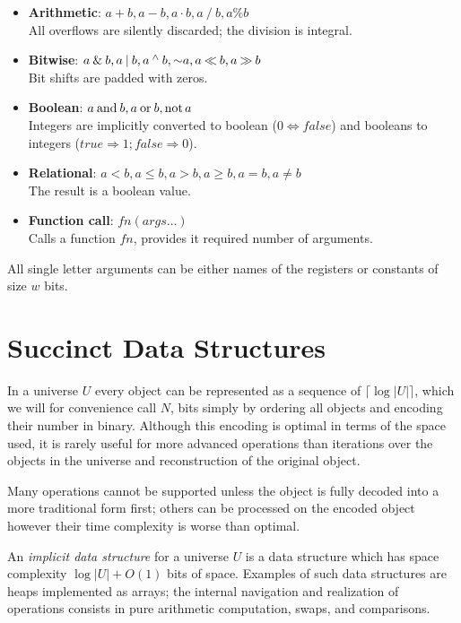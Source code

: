 \begin{enumerate}
\begin{itemize}
		\item \textbf{Arithmetic}: $a + b, a - b, a \cdot b, a \mathbin{/} b, a \% b$ \\
		All overflows are silently discarded; the division is integral.
		\item \textbf{Bitwise}: $a \mathbin{\&} b, a \mathbin{|} b, a \mathbin{^\wedge} b, \mathord{\sim} a, a \mathbin{\ll} b, a \mathbin{\gg} b$ \\
		Bit shifts are padded with zeros.
		\item \textbf{Boolean}: $a \mathbin{\textrm{and}} b, a \mathbin{\textrm{or}} b, \mathord{\textrm{not}\,} a$ \\
		Integers are implicitly converted to boolean ($0 \Leftrightarrow false$) and booleans to integers ($true \Rightarrow 1; false \Rightarrow 0$).
		\item \textbf{Relational}: $a < b, a \le b, a > b, a \ge b, a = b, a \ne b$ \\
		The result is a boolean value.
		\item \textbf{Function call}: $fn(args\ldots)$ \\
		Calls a function $fn$, provides it required number of arguments.
	\end{itemize}
\end{enumerate}
All single letter arguments can be either names of the registers or constants of size $w$ bits.

\section{Succinct Data Structures}

In a universe $U$ every object can be represented as a sequence of $\lceil \log |U| \rceil$, which we will for convenience call $N$, bits simply by ordering all objects and encoding their number in binary.
Although this encoding is optimal in terms of the space used, it is rarely useful for more advanced operations than iterations over the objects in the universe and reconstruction of the original object.

Many operations cannot be supported unless the object is fully decoded into a more traditional form first; others can be processed on the encoded object however their time complexity is worse than optimal.

An \emph{implicit data structure} for a universe $U$ is a data structure which has space complexity $ \log |U| + O(1) $ bits of space.
Examples of such data structures are heaps implemented as arrays; the internal navigation and realization of operations consists in pure arithmetic computation, swaps, and comparisons.

